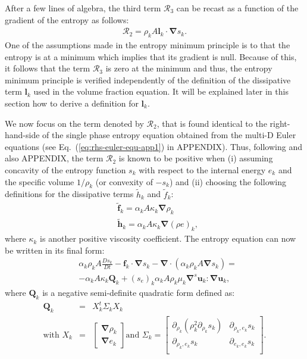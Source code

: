 \documentclass[preprint,10pt]{elsarticle}
\renewcommand{\div}{\mbold{\nabla}\! \cdot \!}
\newcommand{\grad}{\mbold{\nabla}}
\newcommand{\mbold}[1]{\boldsymbol#1}
\newcommand{\eqt}[1]{Eq.~(\ref{#1})}                     %
\begin{document}
After a few lines of algebra, the third term ${\mathcal{R}_3}$ can be recast as a function of the gradient of the entropy as follows:
\begin{align}
 \label{eq:ent-R3-sct4}
  \mathcal{R}_2  =  \rho_k A \mbold l_k \cdot \grad s_k.
\end{align} 
One of the assumptions made in the entropy minimum principle is to that the entropy 
is at a minimum which implies that its gradient is null. Because of this, it follows that
the term $\mathcal{R}_3$ is zero at the minimum and thus, the entropy minimum principle is verified
independently of the definition of the dissipative term $\mbold l_k$ used in the volume fraction
equation. It will be explained later in this section how to derive a definition for $\mbold l_k$.

We now focus on the term denoted by $\mathcal{R}_2$, that is found identical to the right-hand-side of the single phase entropy equation obtained from the multi-D Euler equations (see \eqt{eq:rhs-euler-equ-app1} in APPENDIX). Thus, following \cite{jlg} and also APPENDIX, the term $\mathcal{R}_2$ is known to be positive when (i) assuming concavity of the entropy function $s_k$ with respect to the internal energy $e_k$ and the specific volume $1 / \rho_k$ (or convexity of $-s_k$) and (ii) choosing the following definitions for the dissipative terms $\tilde{h}_k$ and $\tilde{f}_k$:
%
\begin{align}
&\tilde{\mbold f}_k = \alpha_k A \kappa_k \grad \rho_k \\
&\tilde{\mbold h}_k = \alpha_k A \kappa_k \grad \left( \rho e \right)_k,
\end{align}
%  
where $\kappa_k$ is another positive viscosity coefficient. The entropy equation can now be written in its final form:
%
\begin{align}\label{eq:ent-res-7-eqn-diss-terms3}
&\alpha_k \rho_k A \frac{Ds_k}{Dt} - \mbold f_k \cdot \grad s_k - \div \left( \alpha_k \rho_k A \grad s_k \right) = \nonumber\\
&- \alpha_k A \kappa_k \mathbf{Q}_k + (s_e)_k \alpha_k A \rho_k \mu_k \grad^s \mbold u_k : \grad \mbold u_k,
\end{align}
%
where $\mathbf{Q}_k$ is a negative semi-definite quadratic form defined as:
%
\begin{eqnarray}
\mathbf{Q}_k &=& X^t_k \Sigma_k X_k \nonumber \\
\text{with } X_k &=& \begin{bmatrix}
\grad \rho_k \\
\grad e_k 
\end{bmatrix}
\text{and } \Sigma_k = \begin{bmatrix}
       \partial_{\rho_k} (\rho^2_k \partial_{\rho_k} s_k) & \partial_{\rho_k,e_k} s_k  \\[0.3em]
       \partial_{\rho_k,e_k} s_k & \partial_{e_k,e_k} s_k           \\[0.3em]
     \end{bmatrix}. \nonumber 
\end{eqnarray}
\end{document}
